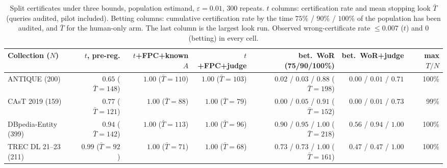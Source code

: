 \documentclass{article}
\newcommand{\eps}{\varepsilon}
\begin{document}
\begin{table}[h]\centering\scriptsize\setlength{\tabcolsep}{2pt}
\caption{Split certificates under three bounds, population estimand, $\eps=0.01$, 300 repeats. $t$ columns: certification rate and mean stopping look $\bar T$ (queries audited, pilot included). Betting columns: cumulative certification rate by the time $75\%$ / $90\%$ / $100\%$ of the population has been audited, and $\bar T$ for the human-only arm. The last column is the largest look run. Observed wrong-certificate rate $\le0.007$ ($t$) and $0$ (betting) in every cell.}\label{tab:exact}
\begin{tabular}{lrrrrrr}\toprule
Collection ($N$) & $t$, pre-reg. & $t$+FPC+known $A$ & $t$+FPC+judge & bet.\ WoR (75/90/100\%) & bet.\ WoR+judge & max $T/N$\\\midrule
ANTIQUE (200) & $0.65$ ($\bar T{=}148$) & $1.00$ ($\bar T{=}110$) & $1.00$ ($\bar T{=}103$) & $0.02$ / $0.03$ / $0.88$ ($\bar T{=}198$) & $0.00$ / $0.01$ / $0.71$ & 100\%\\
CAsT 2019 (159) & $0.77$ ($\bar T{=}121$) & $1.00$ ($\bar T{=}88$) & $1.00$ ($\bar T{=}79$) & $0.00$ / $0.05$ / $0.91$ ($\bar T{=}152$) & $0.00$ / $0.01$ / $0.73$ & 99\%\\
DBpedia-Entity (399) & $0.94$ ($\bar T{=}142$) & $1.00$ ($\bar T{=}113$) & $1.00$ ($\bar T{=}96$) & $0.90$ / $0.95$ / $1.00$ ($\bar T{=}218$) & $0.56$ / $0.94$ / $1.00$ & 100\%\\
TREC DL 21--23 (211) & $0.99$ ($\bar T{=}92$) & $1.00$ ($\bar T{=}71$) & $1.00$ ($\bar T{=}68$) & $0.73$ / $0.73$ / $1.00$ ($\bar T{=}161$) & $0.47$ / $0.47$ / $1.00$ & 100\%\\\bottomrule
\end{tabular}
\end{table}
\end{document}
